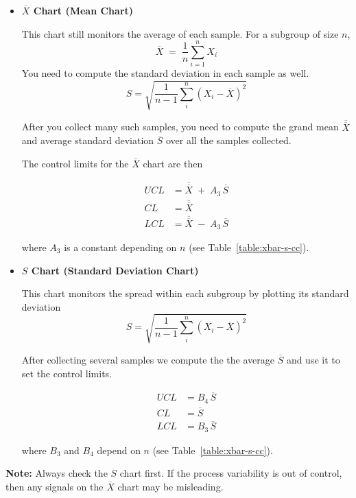 \documentclass[twoside]{book}
\begin{document}
\begin{itemize}
  \item \textbf{$\overline{X}$ Chart (Mean Chart)}

  This chart still monitors the average of each sample.  For a subgroup of size $n$,
  \[
    \overline{X} \;=\; \dfrac{1}{n} \sum_{i=1}^n X_i
  \]
  You need to compute the standard deviation in each sample as well.
  $$S = \sqrt{\dfrac{1}{n-1}\sum_i^n (X_i - \overline{X})^2}$$

  After you collect many such samples, you need to compute the grand mean $\overline{\overline{X}}$ and average standard deviation $\overline{S}$ over all the samples collected.

  The control limits for the $\overline{X}$ chart are then
  \begin{textbox}
  \begin{align*}
      UCL &= \overline{\overline{X}} \;+\; A_3\,\overline{S}\\
      CL  &= \overline{\overline{X}}\\
      LCL &= \overline{\overline{X}} \;-\; A_3\,\overline{S}
    \end{align*}
  \end{textbox}
  where $A_3$ is a constant depending on $n$ (see Table~\ref{table:xbar-s-cc}).

  \medskip

  \item \textbf{$S$ Chart (Standard Deviation Chart)}

  This chart monitors the spread within each subgroup by plotting its standard deviation
  $$S = \sqrt{\dfrac{1}{n-1}\sum_i^n (X_i - \overline{X})^2}$$

  After collecting several samples we compute the the average $\overline{S}$ and use it to set the control limits.
  \begin{textbox}
  \begin{align*}
      UCL &= B_4\,\overline{S}\\
      CL  &= \overline{S}\\
      LCL &= B_3\,\overline{S}
    \end{align*}
  \end{textbox}
  where $B_3$ and $B_4$ depend on $n$ (see Table~\ref{table:xbar-s-cc}).

\end{itemize}

\textbf{Note:}  Always check the $S$ chart first.  If the process variability is out of control, then any signals on the $\overline{X}$ chart may be misleading.
\end{document}
